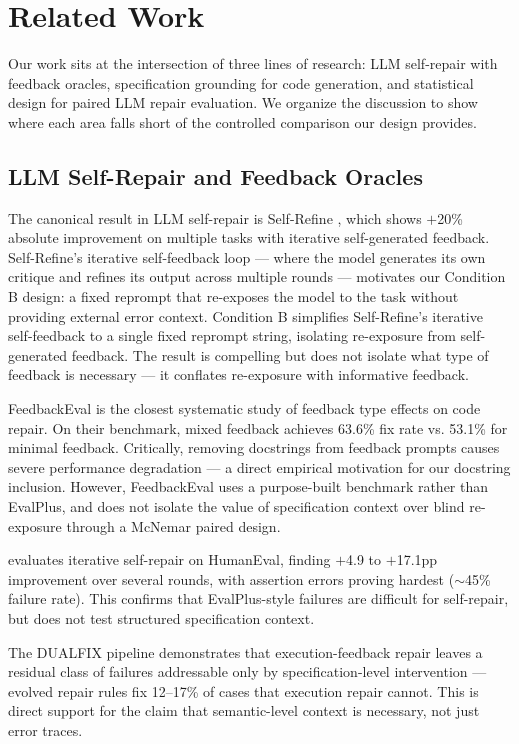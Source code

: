 \section{Related Work}

Our work sits at the intersection of three lines of research: LLM self-repair with
feedback oracles, specification grounding for code generation, and statistical design
for paired LLM repair evaluation. We organize the discussion to show where each area
falls short of the controlled comparison our design provides.

\subsection{LLM Self-Repair and Feedback Oracles}

The canonical result in LLM self-repair is Self-Refine \citep{Madaan2023}, which
shows $+$20\% absolute improvement on multiple tasks with iterative self-generated feedback.
Self-Refine's iterative self-feedback loop --- where the model generates its own critique
and refines its output across multiple rounds --- motivates our Condition B design: a
fixed reprompt that re-exposes the model to the task without providing external error
context. Condition B simplifies Self-Refine's iterative self-feedback to a single fixed
reprompt string, isolating re-exposure from self-generated feedback. The result is
compelling but does not isolate what type of feedback is necessary --- it conflates
re-exposure with informative feedback.

FeedbackEval \citep{Dai2025} is the closest systematic study of feedback type
effects on code repair. On their benchmark, mixed feedback achieves 63.6\% fix rate
vs. 53.1\% for minimal feedback. Critically, removing docstrings from feedback prompts
causes severe performance degradation --- a direct empirical motivation for our
docstring inclusion. However, FeedbackEval uses a purpose-built benchmark rather than
EvalPlus, and does not isolate the value of specification context over blind
re-exposure through a McNemar paired design.

\citet{Arimbur2026} evaluates iterative self-repair on HumanEval, finding $+$4.9 to $+$17.1pp
improvement over several rounds, with assertion errors proving hardest ($\sim$45\% failure
rate). This confirms that EvalPlus-style failures are difficult for self-repair, but
does not test structured specification context.

The DUALFIX pipeline \citep{Akli2026} demonstrates that execution-feedback repair
leaves a residual class of failures addressable only by specification-level
intervention --- evolved repair rules fix 12--17\% of cases that execution repair cannot.
This is direct support for the claim that semantic-level context is necessary, not
just error traces.

